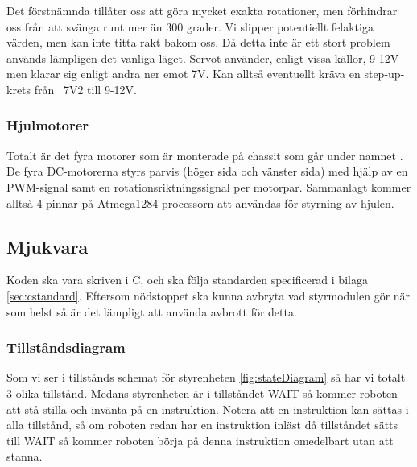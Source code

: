 \documentclass[a4paper,11pt]{article}
\begin{document}
Det förstnämnda tillåter oss att göra mycket exakta rotationer, men förhindrar oss från att svänga runt mer än 300 grader. Vi slipper potentiellt felaktiga värden, men kan inte titta rakt bakom oss. Då detta inte är ett stort problem används lämpligen det vanliga läget. Servot använder, enligt vissa källor, 9-12V men klarar sig enligt andra ner emot 7V. Kan alltså eventuellt kräva en step-up-krets från ~7V2 till 9-12V.


\subsubsection{Hjulmotorer}
Totalt är det fyra motorer som är monterade på chassit som går under namnet \cite{terminator}. De fyra DC-motorerna styrs parvis (höger sida och vänster sida) med hjälp av en PWM-signal samt en rotationsriktningssignal per motorpar. Sammanlagt kommer alltså 4 pinnar på Atmega1284 processorn att användas för styrning av hjulen.

\subsection{Mjukvara}
Koden ska vara skriven i C, och ska följa standarden specificerad i bilaga \ref{sec:cstandard}. Eftersom nödstoppet ska kunna avbryta vad styrmodulen gör när som helst så är det lämpligt att använda avbrott för detta.

\subsubsection{Tillståndsdiagram}
Som vi ser i tillstånds schemat för styrenheten \ref{fig:stateDiagram} så har vi totalt 3 olika tillstånd. Medans styrenheten är i tillståndet WAIT så kommer roboten att stå stilla och invänta på en instruktion. Notera att en instruktion kan sättas i alla tillstånd, så om roboten redan har en instruktion inläst då tillståndet sätts till WAIT så kommer roboten börja på denna instruktion omedelbart utan att stanna.
\end{document}
